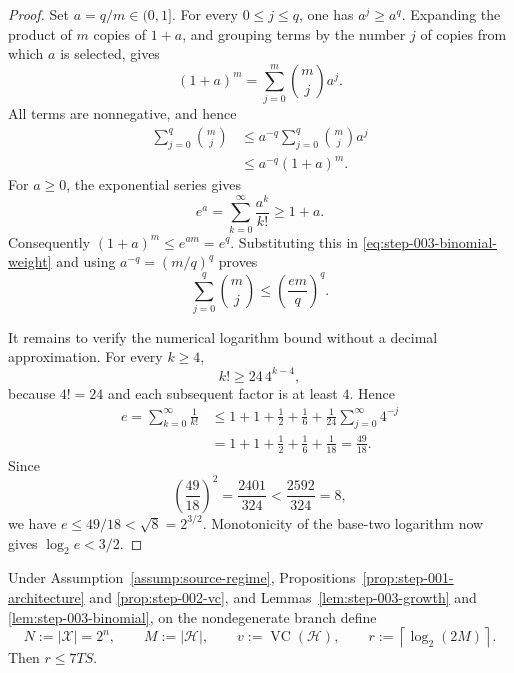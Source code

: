 \begin{proof}
Set $a=q/m\in(0,1]$.  For every $0\leq j\leq q$, one has
$a^j\geq a^q$.  Expanding the product of $m$ copies of $1+a$, and grouping
terms by the number $j$ of copies from which $a$ is selected, gives
\[
(1+a)^m=\sum_{j=0}^{m}\binom mj a^j.
\]
All terms are nonnegative, and hence
\begin{equation}
\begin{aligned}
\sum_{j=0}^{q}\binom mj
&\leq a^{-q}\sum_{j=0}^{q}\binom mj a^j\\
&\leq a^{-q}(1+a)^m.
\end{aligned}
\label{eq:step-003-binomial-weight}
\end{equation}
For $a\geq0$, the exponential series gives
\[
e^a=\sum_{k=0}^{\infty}\frac{a^k}{k!}\geq1+a.
\]
Consequently $(1+a)^m\leq e^{am}=e^q$.  Substituting this in
\eqref{eq:step-003-binomial-weight} and using
$a^{-q}=(m/q)^q$ proves
\[
\sum_{j=0}^{q}\binom mj\leq\left(\frac{em}{q}\right)^q.
\]

It remains to verify the numerical logarithm bound without a decimal
approximation.  For every $k\geq4$,
\[
k!\geq24\,4^{k-4},
\]
because $4!=24$ and each subsequent factor is at least $4$.  Hence
\[
\begin{aligned}
e=\sum_{k=0}^{\infty}\frac1{k!}
&\leq1+1+\frac12+\frac16
+\frac1{24}\sum_{j=0}^{\infty}4^{-j}\\
&=1+1+\frac12+\frac16+\frac1{18}
=\frac{49}{18}.
\end{aligned}
\]
Since
\[
\left(\frac{49}{18}\right)^2
=\frac{2401}{324}<\frac{2592}{324}=8,
\]
we have $e\leq49/18<\sqrt8=2^{3/2}$.  Monotonicity of the base-two
logarithm now gives $\log_2e<3/2$.
\end{proof}

\begin{proposition}
\label{prop:step-003-budget}
Under Assumption~\ref{assump:source-regime},
Propositions~\ref{prop:step-001-architecture} and
\ref{prop:step-002-vc}, and Lemmas~\ref{lem:step-003-growth} and
\ref{lem:step-003-binomial}, on the nondegenerate branch define
\[
N:=|\mathcal X|=2^n,
\qquad M:=|\mathcal H|,
\qquad v:=\operatorname{VC}(\mathcal H),
\qquad r:=\left\lceil\log_2(2M)\right\rceil.
\]
Then $r\leq7TS$.
\end{proposition}

